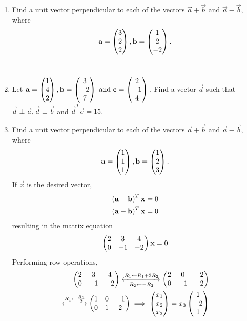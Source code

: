 \documentclass[journal,12pt,twocolumn]{IEEEtran}
\renewcommand\thesection{\arabic{section}}
\begin{document}
\begin{enumerate}[label=\thesection.\arabic*.,ref=\thesection.\theenumi]
\item Find a unit vector perpendicular to each of the vectors 
$\vec{a}+\vec{b}$ and $\vec{a}-\vec{b}$, where 
\begin{align}
\mathbf{a}=\begin{pmatrix}3\\2\\2\end{pmatrix},
\mathbf{b}=\begin{pmatrix}1\\2\\-2\end{pmatrix}.
\end{align}
\\
\solution 
\item Let 
$
\mathbf{a}=\begin{pmatrix}1\\4\\2\end{pmatrix},
\mathbf{b}=\begin{pmatrix}3\\-2\\7\end{pmatrix} \text{ and }
\mathbf{c}=\begin{pmatrix}2\\-1\\4\end{pmatrix}.
$
Find a vector $\vec{d}$ such that $\vec{d}\perp\vec{a},\vec{d}\perp\vec{b}$ and $\vec{d}^T\vec{c} = 15$.
\\
\solution 
\item Find a unit vector perpendicular to each of the vectors
$\vec{a}+\vec{b}$ and $\vec{a}-\vec{b}$, where 
\begin{align}
\mathbf{a}=\begin{pmatrix}1\\1\\1\end{pmatrix},
\mathbf{b}=\begin{pmatrix}1\\2\\3\end{pmatrix}.
\end{align}
%
\solution If $\vec{x}$ is the desired vector, 
%
\begin{align}
\left(\mathbf{a}+\mathbf{b}\right)^T\mathbf{x}=0
\\
\left(\mathbf{a}-\mathbf{b}\right)^T\mathbf{x}=0
\end{align}
%
resulting in the matrix equation 
%
\begin{align}
\begin{pmatrix}2 & 3 & 4\\
0 & -1 & -2\end{pmatrix}\mathbf{x} = 0
\end{align}
%
Performing row operations, 
%
\begin{align}
\myvec{2 & 3 & 4\\
0 & -1 & -2}
\xleftrightarrow[R_2 \leftarrow -R_2]{R_1\leftarrow R_1+3R_2}
\myvec{
2 & 0 & -2\\
0 & -1 & -2
} 
\\
\xleftrightarrow{R_1\leftarrow \frac{R_1}{2}}
\myvec{
1 & 0 & -1\\
0 & 1 & 2
} 
\implies \myvec{x_1\\x_2\\x_3} = x_3\myvec{1\\-2\\1}

\end{align}
\end{enumerate}
\end{document}

